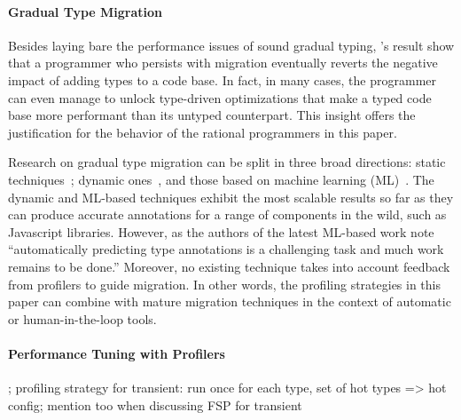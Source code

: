 \paragraph{Gradual Type Migration} Besides laying bare the performance
issues of sound gradual typing, \citet{gtnffvf-jfp-2019}'s result show
that a programmer who persists with migration eventually reverts the
negative impact of adding types to a code base. In fact, in many cases,
the programmer can even manage to unlock type-driven optimizations that
make a typed code base more performant than its untyped counterpart. This
insight offers the justification for the behavior of the rational
programmers in this paper. 

Research on gradual type migration can be split in three broad directions:
static techniques~\cite{rch:in-out-infer-gt, km:ts-type-evo,
mp:gt-decidable, ccew:gt-migrate, gc:gt-infer,
cagg-solver-based-migration,clps-popl-2020,js-infer,ruby-static-infer,unif-infer};
dynamic
ones~\cite{msi:gt-infer-hm, dyn-infer-ruby, profile-guided-typing, gen-ts-decl, jstrace},
and those based on machine learning
(ML)~\cite{lambdanet,nl2ptype,learn-types-big-data,ml-ts}. The dynamic
and ML-based techniques exhibit the most scalable results so far as they
can produce accurate annotations for a range of components in the wild,
such as Javascript libraries. However, as the authors of the latest
ML-based work note ``automatically predicting type annotations is a
challenging task and much work remains to be done.'' Moreover, no existing
technique takes into account feedback from profilers to guide migration.
In other words,  the profiling strategies in this paper can combine
with mature migration techniques in the context of automatic or
human-in-the-loop tools.
 
\paragraph{Performance Tuning with Profilers}

\cite{gprof}

\cite{zoom}

\cite{vertical-profiler}

\cite{grmhn-vmil-2019};
profiling strategy for transient: run once for each type, set of hot types => hot config;
mention too when discussing FSP for transient






